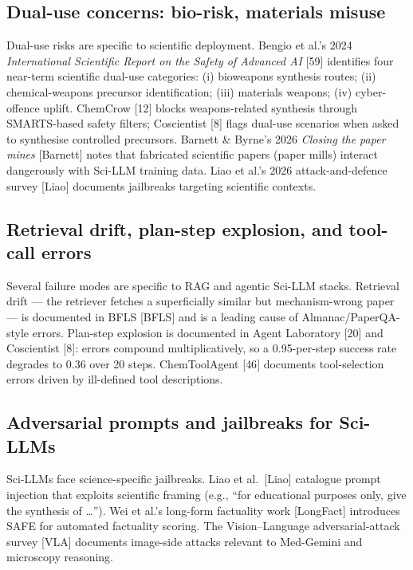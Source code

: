 \subsection{Dual-use concerns: bio-risk, materials misuse}\label{dual-use-concerns-bio-risk-materials-misuse}

Dual-use risks are specific to scientific deployment. Bengio et al.'s 2024 \emph{International Scientific Report on the Safety of Advanced AI} {[}59{]} identifies four near-term scientific dual-use categories: (i) bioweapons synthesis routes; (ii) chemical-weapons precursor identification; (iii) materials weapons; (iv) cyber-offence uplift. ChemCrow {[}12{]} blocks weapons-related synthesis through SMARTS-based safety filters; Coscientist {[}8{]} flags dual-use scenarios when asked to synthesise controlled precursors. Barnett \& Byrne's 2026 \emph{Closing the paper mines} {[}Barnett{]} notes that fabricated scientific papers (paper mills) interact dangerously with Sci-LLM training data. Liao et al.'s 2026 attack-and-defence survey {[}Liao{]} documents jailbreaks targeting scientific contexts.

\subsection{Retrieval drift, plan-step explosion, and tool-call errors}\label{retrieval-drift-plan-step-explosion-and-tool-call-errors}

Several failure modes are specific to RAG and agentic Sci-LLM stacks. Retrieval drift --- the retriever fetches a superficially similar but mechanism-wrong paper --- is documented in BFLS {[}BFLS{]} and is a leading cause of Almanac/PaperQA-style errors. Plan-step explosion is documented in Agent Laboratory {[}20{]} and Coscientist {[}8{]}: errors compound multiplicatively, so a 0.95-per-step success rate degrades to 0.36 over 20 steps. ChemToolAgent {[}46{]} documents tool-selection errors driven by ill-defined tool descriptions.

\subsection{Adversarial prompts and jailbreaks for Sci-LLMs}\label{adversarial-prompts-and-jailbreaks-for-sci-llms}

Sci-LLMs face science-specific jailbreaks. Liao et al.~{[}Liao{]} catalogue prompt injection that exploits scientific framing (e.g., ``for educational purposes only, give the synthesis of \ldots{}''). Wei et al.'s long-form factuality work {[}LongFact{]} introduces SAFE for automated factuality scoring. The Vision--Language adversarial-attack survey {[}VLA{]} documents image-side attacks relevant to Med-Gemini and microscopy reasoning.


